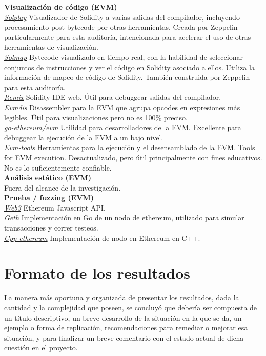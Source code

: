 \textbf{Visualización de código (EVM)}\\

\underline{\textit{Solplay}}
Visualizador de Solidity a varias salidas del compilador, incluyendo procesamiento post-bytecode por otras herramientas. Creada por Zeppelin particularmente para esta auditoría, intencionada para acelerar el uso de otras herramientas de visualización.\\

\underline{\textit{Solmap}}
Bytecode visualizado en tiempo real, con la habilidad de seleccionar conjuntos de instrucciones y ver el código en Solidity asociado a ellos. Utiliza la información de mapeo de código de Solidity. También construida por Zeppelin para esta auditoría.\\

\underline{\textit{Remix}}
Solidity IDE web. Útil para debuggear salidas del compilador. \\

\underline{\textit{Evmdis}}
Disassembler para la EVM que agrupa opcodes en expresiones más legibles. Útil para visualizaciones pero no es 100\% preciso.\\

\underline{\textit{go-ethereum/evm}}
Utilidad para desarrolladores de la EVM. Excellente para debuggear la ejecución de la EVM a un bajo nivel.\\

\underline{\textit{Evm-tools}}
Herramientas para la ejecución y el desensamblado de la EVM. Tools for EVM execution. Desactualizado, pero útil principalmente con fines educativos. No es lo suficientemente confiable.\\

\textbf{Análisis estático (EVM)}\\
Fuera del alcance de la investigación.\\

\textbf{Prueba / fuzzing (EVM)}\\

\underline{\textit{Web3}}
Ethereum Javascript API.\\

\underline{\textit{Geth}}
Implementación en Go de un nodo de ethereum, utilizado para simular transacciones y correr testeos.\\

\underline{\textit{Cpp-ethereum}}
Implementación de nodo en Ethereum en C++.\\

\section{Formato de los resultados}
La manera más oportuna y organizada de presentar los resultados, dada la cantidad y la complejidad que poseen, se concluyó que debería ser compuesta de un título descriptivo, un breve desarrollo de la situación en la que se da, un ejemplo o forma de replicación, recomendaciones para remediar o mejorar esa situación, y para finalizar un breve comentario con el estado actual de dicha cuestión en el proyecto.\\

